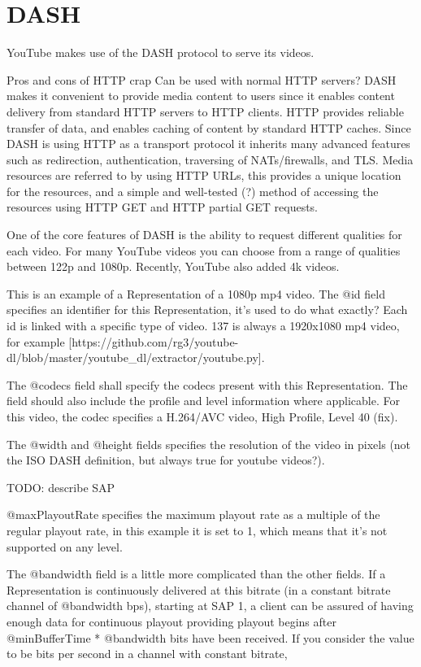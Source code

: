 \section{DASH}

YouTube makes use of the DASH protocol to serve its videos.

Pros and cons of HTTP crap Can be used with normal HTTP servers? DASH
makes it convenient to provide media content to users since it enables
content delivery from standard HTTP servers to HTTP clients. HTTP
provides reliable transfer of data, and enables caching of content by
standard HTTP caches. Since DASH is using HTTP as a transport protocol
it inherits many advanced features such as redirection, authentication,
traversing of NATs/firewalls, and TLS. Media resources are referred to
by using HTTP URLs, this provides a unique location for the resources,
and a simple and well-tested (?) method of accessing the resources using
HTTP GET and HTTP partial GET requests.

One of the core features of DASH is the ability to request different
qualities for each video. For many YouTube videos you can choose from a
range of qualities between 122p and 1080p. Recently, YouTube also added
4k videos.

This is an example of a Representation of a 1080p mp4 video. The @id
field specifies an identifier for this Representation, it's used to do
what exactly? Each id is linked with a specific type of video. 137 is
always a 1920x1080 mp4 video, for example
{[}https://github.com/rg3/youtube-dl/blob/master/youtube\_dl/extractor/youtube.py{]}.

The @codecs field shall specify the codecs present with this
Representation. The field should also include the profile and level
information where applicable. For this video, the codec specifies a
H.264/AVC video, High Profile, Level 40 (fix).

The @width and @height fields specifies the resolution of the video in
pixels (not the ISO DASH definition, but always true for youtube
videos?).

TODO: describe SAP

@maxPlayoutRate specifies the maximum playout rate as a multiple of the
regular playout rate, in this example it is set to 1, which means that
it's not supported on any level.

The @bandwidth field is a little more complicated than the other fields.
If a Representation is continuously delivered at this bitrate (in a
constant bitrate channel of @bandwidth bps), starting at SAP 1, a client
can be assured of having enough data for continuous playout providing
playout begins after @minBufferTime * @bandwidth bits have been
received. If you consider the value to be bits per second in a channel
with constant bitrate,

